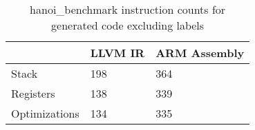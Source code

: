 \begin{table}[h!]
\centering
\begin{tabular}{p{}p{}p{}}
  \hline
 & LLVM IR & ARM Assembly \\ 
  \hline
Stack & 198 & 364 \\ 
  Registers & 138 & 339 \\ 
  Optimizations & 134 & 335 \\ 
   \hline
\end{tabular}
\caption{hanoi\_benchmark instruction counts for generated code excluding labels}
\end{table}
